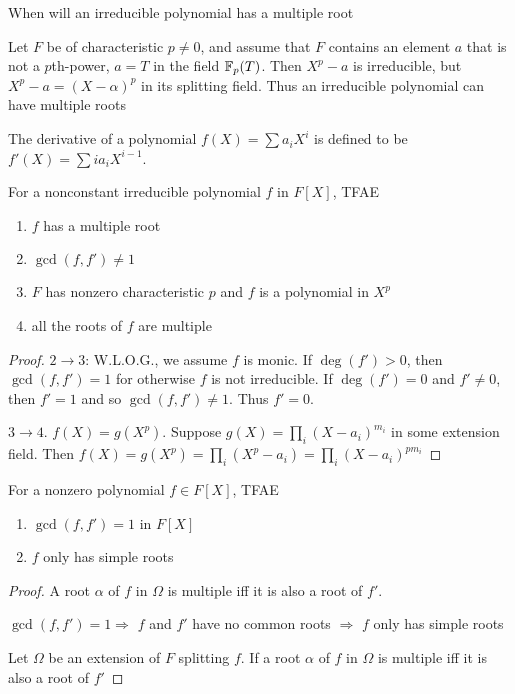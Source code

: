 \documentclass[11pt]{article}
\begin{document}
When will an irreducible polynomial has a multiple root

\begin{examplle}[]
\label{2.11}
Let \(F\) be of characteristic \(p\neq 0\), and assume that \(F\) contains an element \(a\) that is
not a \(p\)th-power, \(a=T\) in the field \(\mathbb{F}_p(T)\). Then \(X^p-a\) is irreducible,
but \(X^p-a=(X-\alpha)^p\) in its splitting field. Thus an irreducible polynomial can have multiple roots
\end{examplle}

The derivative of a polynomial \(f(X)=\sum a_iX^i\) is defined to be \(f'(X)=\sum ia_iX^{i-1}\).

\begin{proposition}[]
\label{2.12}
For a nonconstant irreducible polynomial \(f\) in \(F[X]\), TFAE
\begin{enumerate}
\item \(f\) has a multiple root
\item \(\gcd(f,f')\neq 1\)
\item \(F\) has nonzero characteristic \(p\) and \(f\) is a polynomial in \(X^p\)
\item all the roots of \(f\) are multiple
\end{enumerate}
\end{proposition}

\begin{proof}


\(2\to 3\): W.L.O.G., we assume \(f\) is monic. If \(\deg(f')>0\), then \(\gcd(f,f')=1\) for otherwise \(f\)
is not irreducible. If \(\deg(f')=0\) and \(f'\neq 0\), then \(f'=1\) and so \(\gcd(f,f')\neq 1\). Thus \(f'=0\).

\(3\to 4\). \(f(X)=g(X^p)\). Suppose \(g(X)=\prod_i(X-a_i)^{m_i}\) in some extension field. Then
\(f(X)=g(X^p)=\prod_i(X^p-a_i)=\prod_i(X-a_i)^{pm_i}\)
\end{proof}

\begin{proposition}[]
For a nonzero polynomial \(f\in F[X]\), TFAE
\label{2.13}
\begin{enumerate}
\item \(\gcd(f,f')=1\) in \(F[X]\)
\item \(f\) only has simple roots
\end{enumerate}
\end{proposition}

\begin{proof}
A root \(\alpha\) of \(f\) in \(\Omega\) is multiple iff it is also a root of \(f'\).

\(\gcd(f,f')=1\Rightarrow\) \(f\) and \(f'\) have no common roots \(\Rightarrow\) \(f\) only has simple roots

Let \(\Omega\) be an extension of \(F\) splitting \(f\). If a root \(\alpha\) of \(f\) in \(\Omega\) is multiple iff it is
also a root of \(f'\)
\end{proof}
\end{document}
